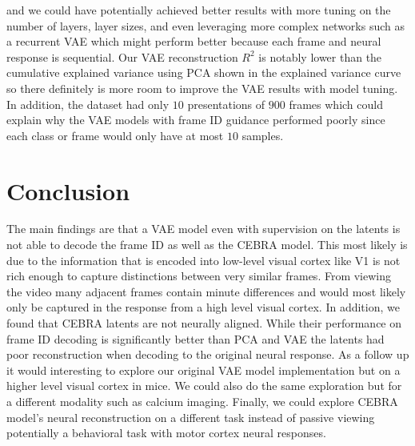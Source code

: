 \documentclass[12pt, letterpaper]{article}
\begin{document}
and we could have potentially achieved better results with more tuning on the number of layers, layer sizes, and even leveraging more complex networks such as a recurrent VAE which might perform better because each frame and neural response is sequential. Our VAE reconstruction $R^2$ is notably lower than the cumulative explained variance using PCA shown in the explained variance curve so there definitely is more room to improve the VAE results with model tuning. In addition, the dataset had only $10$ presentations of $900$ frames which could explain why the VAE models with frame ID guidance performed poorly since each class or frame would only have at most $10$ samples. 

\section{Conclusion}
\label{sec:conclusion}
The main findings are that a VAE model even with supervision on the latents is not able to decode the frame ID as well as the CEBRA \cite{schneider2023} model. This most likely is due to the information that is encoded into low-level visual cortex like V1 is not rich enough to capture distinctions between very similar frames. From viewing the video many adjacent frames contain minute differences and would most likely only be captured in the response from a high level visual cortex. In addition, we found that CEBRA \cite{schneider2023} latents are not neurally aligned. While their performance on frame ID decoding is significantly better than PCA and VAE the latents had poor reconstruction when decoding to the original neural response. As a follow up it would interesting to explore our original VAE model implementation but on a higher level visual cortex in mice. We could also do the same exploration but for a different modality such as calcium imaging. Finally, we could explore CEBRA \cite{schneider2023} model's neural reconstruction on a different task instead of passive viewing potentially a behavioral task with motor cortex neural responses. 
\end{document}
